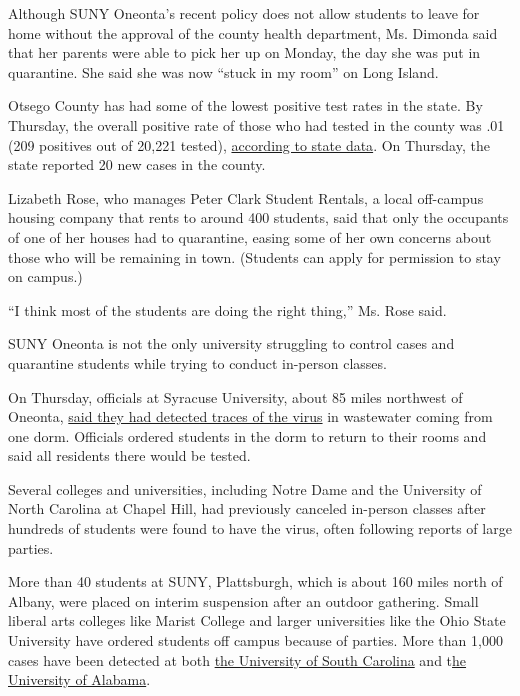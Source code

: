Although SUNY Oneonta's recent policy does not allow students to leave
for home without the approval of the county health department, Ms.
Dimonda said that her parents were able to pick her up on Monday, the
day she was put in quarantine. She said she was now ``stuck in my room''
on Long Island.

Otsego County has had some of the lowest positive test rates in the
state. By Thursday, the overall positive rate of those who had tested in
the county was .01 (209 positives out of 20,221 tested),
\href{https://covid19tracker.health.ny.gov/views/NYS-COVID19-Tracker/NYSDOHCOVID-19Tracker-TableView?\%3Aembed=yes\&\%3Atoolbar=no\&\%3Atabs=n}{according
to state data}. On Thursday, the state reported 20 new cases in the
county.

Lizabeth Rose, who manages Peter Clark Student Rentals, a local
off-campus housing company that rents to around 400 students, said that
only the occupants of one of her houses had to quarantine, easing some
of her own concerns about those who will be remaining in town. (Students
can apply for permission to stay on campus.)

``I think most of the students are doing the right thing,'' Ms. Rose
said.

SUNY Oneonta is not the only university struggling to control cases and
quarantine students while trying to conduct in-person classes.

On Thursday, officials at Syracuse University, about 85 miles northwest
of Oneonta,
\href{https://twitter.com/chrishipp15_/status/1301616678925721601?s=20}{said
they had detected traces of the virus} in wastewater coming from one
dorm. Officials ordered students in the dorm to return to their rooms
and said all residents there would be tested.

Several colleges and universities, including Notre Dame and the
University of North Carolina at Chapel Hill, had previously canceled
in-person classes after hundreds of students were found to have the
virus, often following reports of large parties.

More than 40 students at SUNY, Plattsburgh, which is about 160 miles
north of Albany, were placed on interim suspension after an outdoor
gathering. Small liberal arts colleges like Marist College and larger
universities like the Ohio State University have ordered students off
campus because of parties. More than 1,000 cases have been detected at
both
\href{https://www.nytimes3xbfgragh.onion/2020/09/02/world/coronavirus-covid-live.html}{the
University of South Carolina} and
t\href{https://www.nytimes3xbfgragh.onion/aponline/2020/08/28/us/ap-us-virus-outbreak-alabama.html}{he
University of Alabama}.

